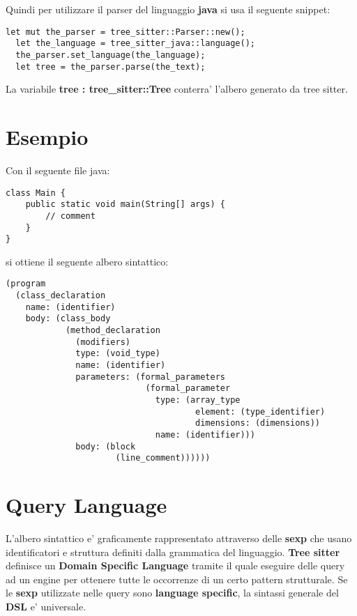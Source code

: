 Quindi per utilizzare il parser del linguaggio \textbf{java} si usa il seguente snippet:

\begin{Verbatim}[samepage=true]
  let mut the_parser = tree_sitter::Parser::new();
  let the_language = tree_sitter_java::language();
  the_parser.set_language(the_language);
  let tree = the_parser.parse(the_text);
\end{Verbatim}

La variabile \textbf{tree : tree\_sitter::Tree} conterra' l'albero generato da tree sitter.


\section{Esempio}

Con il seguente file java:

\begin{Verbatim}[samepage=true]
class Main {
	public static void main(String[] args) {
    	// comment
    }
}
\end{Verbatim}

si ottiene il seguente albero sintattico:

\begin{Verbatim}[samepage=true]
(program
  (class_declaration
    name: (identifier)
    body: (class_body
            (method_declaration
              (modifiers)
              type: (void_type)
              name: (identifier)
              parameters: (formal_parameters
                            (formal_parameter
                              type: (array_type
                                      element: (type_identifier)
                                      dimensions: (dimensions))
                              name: (identifier)))
              body: (block
                      (line_comment))))))
\end{Verbatim}

\section{Query Language}

L'albero sintattico e' graficamente rappresentato attraverso delle \textbf{sexp} che usano identificatori e struttura definiti dalla grammatica del linguaggio.
\textbf{Tree sitter} definisce un \textbf{Domain Specific Language} \cite{TreeSitterQuerySyntax} tramite il quale eseguire delle query ad un engine per ottenere tutte le occorrenze di un certo pattern strutturale.
Se le \textbf{sexp} utilizzate nelle query sono \textbf{language specific},  la sintassi generale del \textbf{DSL} e' universale.

